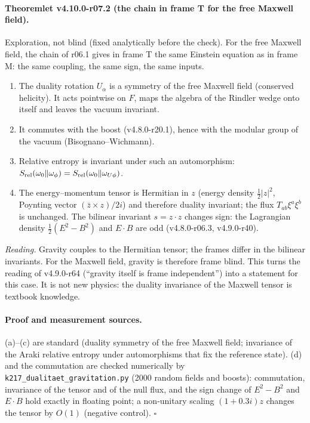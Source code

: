 \paragraph{Theoremlet v4.10.0-r07.2 (the chain in frame T for the free Maxwell field).}
Exploration, not blind (fixed analytically before the check).  For the free Maxwell field, the chain of r06.1 gives in frame T the same Einstein
equation as in frame M: the same coupling, the same sign, the same inputs.
\begin{enumerate}[leftmargin=2em]
\item[(a)] The duality rotation \(U_\alpha\) is a symmetry of the free Maxwell field (conserved helicity).  It acts pointwise on \(F\), maps the algebra of
the Rindler wedge onto itself and leaves the vacuum invariant.
\item[(b)] It commutes with the boost (v4.8.0-r20.1), hence with the modular group of the vacuum (Bisognano--Wichmann).
\item[(c)] Relative entropy is invariant under such an automorphism: \(S_{\rm rel}(\omega_0\Vert\omega_\phi)=S_{\rm rel}(\omega_0\Vert\omega_{U\phi})\).
\item[(d)] The energy--momentum tensor is Hermitian in \(z\) (energy density \(\tfrac12|z|^2\), Poynting vector \((\bar z\times z)/2i\)) and therefore
duality invariant; the flux \(T_{ab}\xi^a\xi^b\) is unchanged.  The bilinear invariant \(s=z\cdot z\) changes sign: the Lagrangian density
\(\tfrac12(E^2-B^2)\) and \(E\cdot B\) are odd (v4.8.0-r06.3, v4.9.0-r40).
\end{enumerate}
\emph{Reading.} Gravity couples to the Hermitian tensor; the frames differ in the bilinear invariants.  For the Maxwell field, gravity is therefore
frame blind.  This turns the reading of v4.9.0-r64 (``gravity itself is frame independent'') into a statement for this case.  It is not new physics:
the duality invariance of the Maxwell tensor is textbook knowledge.

\paragraph{Proof and measurement sources.}
(a)--(c) are standard (duality symmetry of the free Maxwell field; invariance of the Araki relative entropy under automorphisms that fix the
reference state).  (d) and the commutation are checked numerically by \texttt{k217\_\allowbreak dualitaet\_\allowbreak gravitation.py} (2000 random fields and
boosts): commutation, invariance of the tensor and of the null flux, and the sign change of \(E^2-B^2\) and \(E\cdot B\) hold exactly in floating point;
a non-unitary scaling \((1+0.3i)z\) changes the tensor by \(O(1)\) (negative control).  \(\square\)

